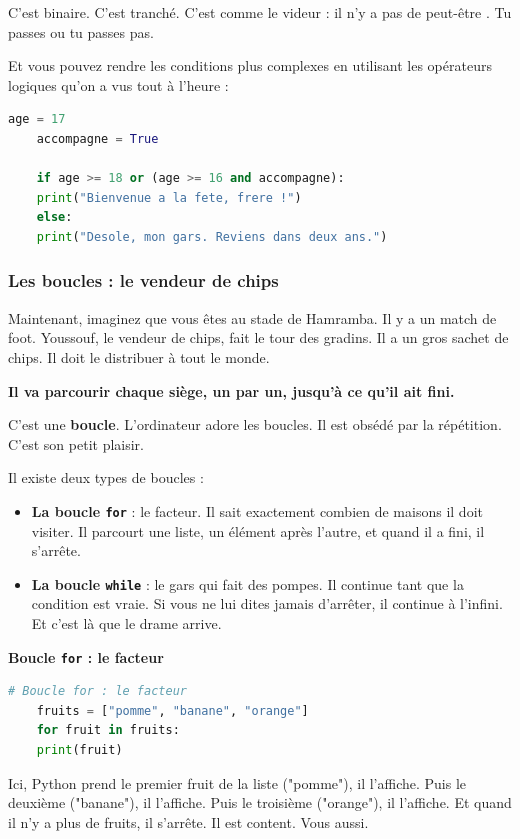 \documentclass[12pt,a4paper]{article}
\begin{document}
C'est binaire. C'est tranché. C'est comme le videur : il n'y a pas de \og peut-être \fg. Tu passes ou tu passes pas.

Et vous pouvez rendre les conditions plus complexes en utilisant les opérateurs logiques qu'on a vus tout à l'heure :

\begin{lstlisting}[language=Python]
	age = 17
	accompagne = True
	
	if age >= 18 or (age >= 16 and accompagne):
	print("Bienvenue a la fete, frere !")
	else:
	print("Desole, mon gars. Reviens dans deux ans.")
\end{lstlisting}

\subsubsection{Les boucles : le vendeur de chips}

Maintenant, imaginez que vous êtes au stade de Hamramba. Il y a un match de foot. Youssouf, le vendeur de chips, fait le tour des gradins. Il a un gros sachet de chips. Il doit le distribuer à tout le monde.

\textbf{Il va parcourir chaque siège, un par un, jusqu'à ce qu'il ait fini.}

C'est une \textbf{boucle}. L'ordinateur adore les boucles. Il est obsédé par la répétition. C'est son petit plaisir.

Il existe deux types de boucles :

\begin{itemize}
	\item [\ding{182}] \textbf{La boucle \texttt{for}} : le facteur. Il sait exactement combien de maisons il doit visiter. Il parcourt une liste, un élément après l'autre, et quand il a fini, il s'arrête.
	\item [\ding{183}] \textbf{La boucle \texttt{while}} : le gars qui fait des pompes. Il continue tant que la condition est vraie. Si vous ne lui dites jamais d'arrêter, il continue à l'infini. Et c'est là que le drame arrive.
\end{itemize}

\textbf{Boucle \texttt{for} : le facteur}

\begin{lstlisting}[language=Python]
	# Boucle for : le facteur
	fruits = ["pomme", "banane", "orange"]
	for fruit in fruits:
	print(fruit)
\end{lstlisting}

Ici, Python prend le premier fruit de la liste ("pomme"), il l'affiche. Puis le deuxième ("banane"), il l'affiche. Puis le troisième ("orange"), il l'affiche. Et quand il n'y a plus de fruits, il s'arrête. Il est content. Vous aussi.
\end{document}
